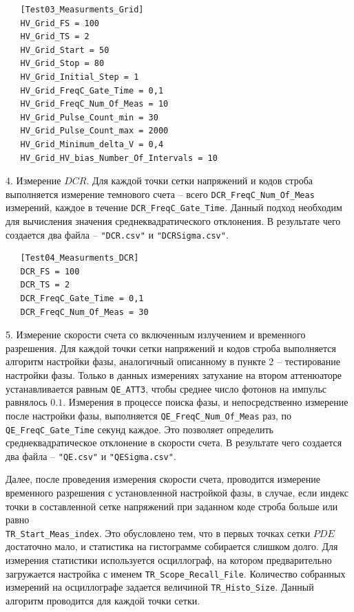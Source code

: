 \documentclass[12pt]{article}
\begin{document}
\begin{lstlisting}
   [Test03_Measurments_Grid]
   HV_Grid_FS = 100
   HV_Grid_TS = 2
   HV_Grid_Start = 50
   HV_Grid_Stop = 80
   HV_Grid_Initial_Step = 1
   HV_Grid_FreqC_Gate_Time = 0,1
   HV_Grid_FreqC_Num_Of_Meas = 10
   HV_Grid_Pulse_Count_min = 30
   HV_Grid_Pulse_Count_max = 2000
   HV_Grid_Minimum_delta_V = 0,4
   HV_Grid_HV_bias_Number_Of_Intervals = 10
\end{lstlisting}

4. Измерение $DCR$. Для каждой точки сетки напряжений и кодов строба выполняется измерение темнового счета -- всего \verb|DCR_FreqC_Num_Of_Meas| измерений, каждое в течение \verb|DCR_FreqC_Gate_Time|. Данный подход необходим для вычисления значения среднеквадратического отклонения. В результате чего создается два файла -- \verb|"DCR.csv"| и \verb|"DCRSigma.csv"|.


\begin{lstlisting}
   [Test04_Measurments_DCR]
   DCR_FS = 100
   DCR_TS = 2
   DCR_FreqC_Gate_Time = 0,1
   DCR_FreqC_Num_Of_Meas = 30
\end{lstlisting}

5. Измерение скорости счета со включенным излучением и временного разрешения. Для каждой точки сетки напряжений и кодов строба выполняется алгоритм настройки фазы, аналогичный описанному в пункте 2 -- тестирование настройки фазы. Только в данных измерениях затухание на втором аттенюаторе устанавливается равным \verb|QE_ATT3|, чтобы среднее число фотонов на импульс равнялось $0.1$.  Измерения в процессе поиска фазы, и непосредственно измерение после настройки фазы, выполняется \verb|QE_FreqC_Num_Of_Meas| раз, по \verb|QE_FreqC_Gate_Time| секунд каждое. Это позволяет определить среднеквадратическое отклонение в скорости счета. В результате чего создается два файла -- \verb|"QE.csv"| и \verb|"QESigma.csv"|.

Далее, после проведения измерения скорости счета, проводится измерение временного разрешения с установленной настройкой фазы, в случае, если индекс точки  в составленной сетке напряжений при заданном коде строба больше или равно \\ \verb|TR_Start_Meas_index|. Это обусловлено тем, что в первых точках сетки $PDE$ достаточно мало, и статистика на гистограмме собирается слишком долго. Для измерения статистики используется осциллограф, на котором предварительно загружается настройка с именем \verb|TR_Scope_Recall_File|. Количество собранных измерений на осциллографе задается величиной \verb|TR_Histo_Size|. Данный алгоритм проводится для каждой точки сетки. 
 
\end{document}
